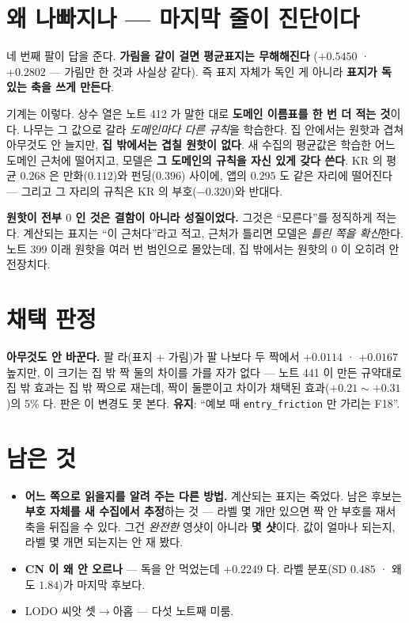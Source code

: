 \documentclass[11pt]{article}
\begin{document}
\section{왜 나빠지나 --- 마지막 줄이 진단이다}

네 번째 팔이 답을 준다. \textbf{가림을 같이 걸면 평균표지는 무해해진다}
($+0.5450$ · $+0.2802$ --- 가림만 한 것과 사실상 같다). 즉 표지 자체가
독인 게 아니라 \textbf{표지가 독 있는 축을 쓰게 만든다}.

기계는 이렇다. 상수 열은 노트 412 가 말한 대로 \textbf{도메인 이름표를 한
번 더 적는 것}이다. 나무는 그 값으로 갈라 \emph{도메인마다 다른 규칙}을
학습한다. 집 안에서는 원핫과 겹쳐 아무것도 안 늘지만, \textbf{집 밖에서는
겹칠 원핫이 없다}. 새 수집의 평균값은 학습한 어느 도메인 근처에
떨어지고, 모델은 \textbf{그 도메인의 규칙을 자신 있게 갖다 쓴다}. KR 의
평균 $0.268$ 은 만화($0.112$)와 펀딩($0.396$) 사이에, 앱의 $0.295$ 도
같은 자리에 떨어진다 --- 그리고 그 자리의 규칙은 KR 의 부호($-0.320$)와
반대다.

\textbf{원핫이 전부 $0$ 인 것은 결함이 아니라 성질이었다.} 그것은
``모른다''를 정직하게 적는다. 계산되는 표지는 ``이 근처다''라고 적고,
근처가 틀리면 모델은 \emph{틀린 쪽을 확신}한다. 노트 399 이래 원핫을
여러 번 범인으로 몰았는데, 집 밖에서는 원핫의 $0$ 이 오히려 안전장치다.

\section{채택 판정}

\textbf{아무것도 안 바꾼다.} 팔 라(표지 $+$ 가림)가 팔 나보다 두 짝에서
$+0.0114$ · $+0.0167$ 높지만, 이 크기는 집 밖 짝 둘의 차이를 가를 자가
없다 --- 노트 441 이 만든 규약대로 집 밖 효과는 집 밖 짝으로 재는데,
짝이 둘뿐이고 차이가 채택된 효과($+0.21 \sim +0.31$)의 5\% 다. 판은 이
변경도 못 본다. \textbf{유지}: ``예보 때 \texttt{entry\_friction} 만
가리는 F18''.

\section*{남은 것}

\begin{itemize}
\item \textbf{어느 쪽으로 읽을지를 알려 주는 다른 방법.} 계산되는 표지는
죽었다. 남은 후보는 \textbf{부호 자체를 새 수집에서 추정}하는 것 ---
라벨 몇 개만 있으면 짝 안 부호를 재서 축을 뒤집을 수 있다. 그건
\emph{완전한} 영샷이 아니라 \textbf{몇 샷}이다. 값이 얼마나 되는지,
라벨 몇 개면 되는지는 안 재 봤다.
\item \textbf{CN 이 왜 안 오르나} --- 독을 안 먹었는데 $+0.2249$ 다.
라벨 분포(SD $0.485$ · 왜도 $1.84$)가 마지막 후보다.
\item LODO 씨앗 셋$\to$아홉 --- 다섯 노트째 미룸.
\end{itemize}
\end{document}
